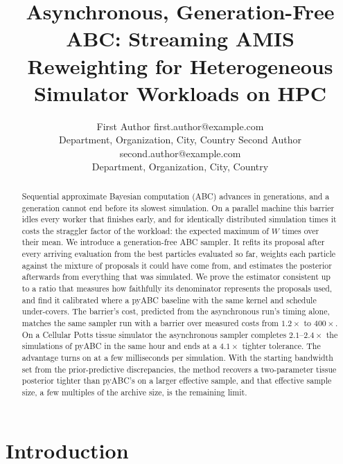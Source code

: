 \documentclass[10pt]{article}
\title{Asynchronous, Generation-Free ABC: Streaming AMIS Reweighting for Heterogeneous Simulator Workloads on HPC}
\author{\name First Author \email first.author@example.com \\
      \addr Department, Organization, City, Country
      \AND
      \name Second Author \email second.author@example.com \\
      \addr Department, Organization, City, Country}
\theoremstyle{plain}
\theoremstyle{definition}
\begin{document}
\maketitle

\begin{abstract}
Sequential approximate Bayesian computation (ABC) advances in generations, and a generation cannot end before its slowest simulation. On a parallel machine this barrier idles every worker that finishes early, and for identically distributed simulation times it costs the straggler factor of the workload: the expected maximum of $W$ times over their mean. We introduce a generation-free ABC sampler. It refits its proposal after every arriving evaluation from the best particles evaluated so far, weights each particle against the mixture of proposals it could have come from, and estimates the posterior afterwards from everything that was simulated. We prove the estimator consistent up to a ratio that measures how faithfully its denominator represents the proposals used, and find it calibrated where a pyABC baseline with the same kernel and schedule under-covers. The barrier's cost, predicted from the asynchronous run's timing alone, matches the same sampler run with a barrier over measured costs from $1.2\times$ to $400\times$. On a Cellular Potts tissue simulator the asynchronous sampler completes $2.1$--$2.4\times$ the simulations of pyABC in the same hour and ends at a $4.1\times$ tighter tolerance. The advantage turns on at a few milliseconds per simulation. With the starting bandwidth set from the prior-predictive discrepancies, the method recovers a two-parameter tissue posterior tighter than pyABC's on a larger effective sample, and that effective sample size, a few multiples of the archive size, is the remaining limit.
\end{abstract}

\section{Introduction}\label{sec:introduction}
\end{document}
